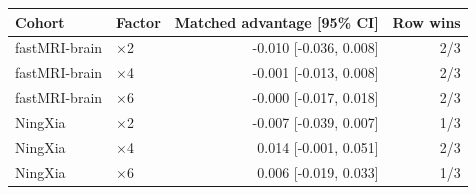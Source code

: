 \begin{tabular}{llrr}
\toprule
Cohort & Factor & Matched advantage [95\% CI] & Row wins \\
\midrule
fastMRI-brain & $\times$2 & -0.010 [-0.036, 0.008] & 2/3 \\
fastMRI-brain & $\times$4 & -0.001 [-0.013, 0.008] & 2/3 \\
fastMRI-brain & $\times$6 & -0.000 [-0.017, 0.018] & 2/3 \\
NingXia & $\times$2 & -0.007 [-0.039, 0.007] & 1/3 \\
NingXia & $\times$4 & 0.014 [-0.001, 0.051] & 2/3 \\
NingXia & $\times$6 & 0.006 [-0.019, 0.033] & 1/3 \\
\bottomrule
\end{tabular}
